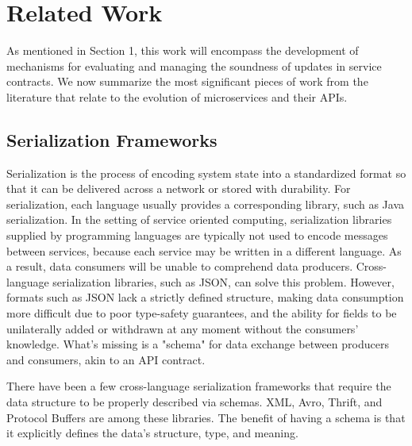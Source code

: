 
%

\chapter{Related Work}
\label{cha:related_work}

As mentioned in Section 1, this work will encompass the development of
mechanisms for evaluating and managing the soundness of updates in service contracts.
We now summarize the most significant pieces of work from the literature
that relate to the evolution of microservices and their APIs.

\section{Serialization Frameworks} %
\label{sec:serialization_frameworks}

Serialization is the process of encoding system state into a standardized format so that it can be delivered across a network or stored with durability.
For serialization, each language usually provides a corresponding library, such as Java serialization.
In the setting of service oriented computing, serialization libraries supplied by programming languages are typically not used to encode messages between services,
because each service may be written in a different language. As a result, data consumers will be unable to comprehend data producers.
Cross-language serialization libraries, such as JSON, can solve this problem.
However, formats such as JSON lack a strictly defined structure,
making data consumption more difficult due to poor type-safety guarantees, and the ability for fields to be unilaterally added or withdrawn at any moment without the consumers' knowledge.
What's missing is a "schema" for data exchange between producers and consumers, akin to an API contract.

There have been a few cross-language serialization frameworks that require the data structure to be properly described via schemas.
XML, Avro, Thrift, and Protocol Buffers are among these libraries.
The benefit of having a schema is that it explicitly defines the data's structure, type, and meaning.

